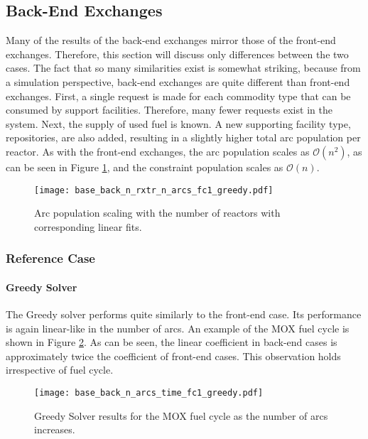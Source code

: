 \subsection{Back-End Exchanges}

Many of the results of the back-end exchanges mirror those of the front-end
exchanges. Therefore, this section will discuss only differences between the two
cases. The fact that so many similarities exist is somewhat striking, because
from a simulation perspective, back-end exchanges are quite different than
front-end exchanges. First, a single request is made for each commodity type
that can be consumed by support facilities. Therefore, many fewer requests exist
in the system. Next, the supply of used fuel is known. A new supporting facility
type, repositories, are also added, resulting in a slightly higher total arc
population per reactor. As with the front-end exchanges, the arc population
scales as $\mathcal{O}(n^2)$, as can be seen in Figure
\ref{fig:base_back_n_rxtr_n_arcs_fc1_greedy}, and the constraint population
scales as $\mathcal{O}(n)$.

\begin{figure}[h!]
  \begin{center}
    \texttt{[image: base\_back\_n\_rxtr\_n\_arcs\_fc1\_greedy.pdf]}
    \caption{
      \label{fig:base_back_n_rxtr_n_arcs_fc1_greedy}
      Arc population scaling with the number of reactors with corresponding linear fits.}
  \end{center}
\end{figure}

\subsubsection{Reference Case}

\paragraph{Greedy Solver}

The Greedy solver performs quite similarly to the front-end case. Its
performance is again linear-like in the number of arcs. An example of the MOX
fuel cycle is shown in Figure \ref{fig:base_back_n_arcs_time_fc1_greedy}. As can
be seen, the linear coefficient in back-end cases is approximately twice the
coefficient of front-end cases. This observation holds irrespective of fuel
cycle.

\begin{figure}[h!]
  \begin{center}
    \texttt{[image: base\_back\_n\_arcs\_time\_fc1\_greedy.pdf]}
    \caption{
      \label{fig:base_back_n_arcs_time_fc1_greedy}
      Greedy Solver results for the MOX fuel cycle as the number of arcs
      increases.      
    }
  \end{center}
\end{figure}

